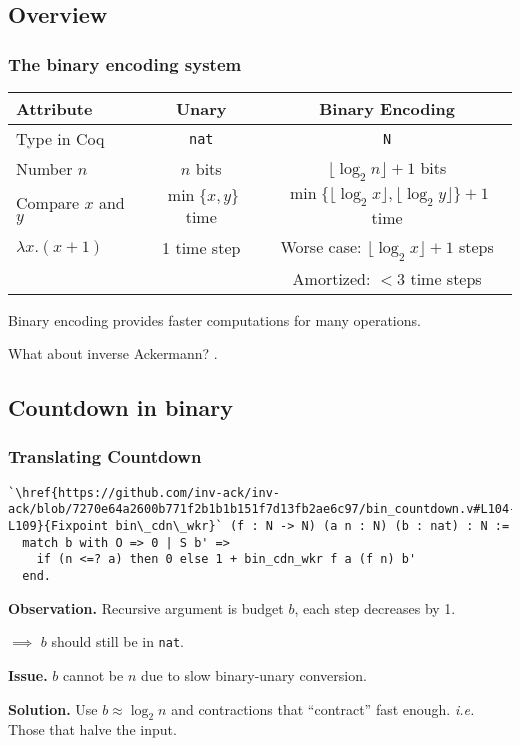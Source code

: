
\subsection{Overview}

\begin{frame}
\frametitle{The binary encoding system}

\begin{tabular}{l|c|c}
	Attribute & Unary & Binary Encoding \\ \hline
	Type in Coq & \texttt{nat} & \texttt{N} \\[7pt]
	Number $n$ & $n$ bits & $\lfloor \log_2n \rfloor + 1$ bits \\[7pt]
	Compare $x$ and $y$ & $\min\{x, y\}$ time & $\min\{\lfloor \log_2x \rfloor, \lfloor \log_2y \rfloor\} + 1$ time \\[9pt]
	$\lambda x. (x + 1)$ & 1 time step & Worse case: $\lfloor \log_2x \rfloor + 1$ steps \\
	                     &             & Amortized: $< 3$ time steps \\
	                    
\end{tabular}

\bigskip

Binary encoding provides faster computations for many operations.

\smallskip

What about inverse Ackermann? .

\end{frame}


\subsection{Countdown in binary}


\begin{frame}[fragile]
\frametitle{Translating Countdown}

\begin{lstlisting}
`\href{https://github.com/inv-ack/inv-ack/blob/7270e64a2600b771f2b1b1b151f7d13fb2ae6c97/bin_countdown.v#L104-L109}{Fixpoint bin\_cdn\_wkr}` (f : N -> N) (a n : N) (b : nat) : N :=
  match b with O => 0 | S b' =>
    if (n <=? a) then 0 else 1 + bin_cdn_wkr f a (f n) b'
  end.
\end{lstlisting}

\bigskip

\textbf{Observation.} Recursive argument is budget $b$, each step decreases by 1.

$\implies$ $b$ should still be in \texttt{nat}.

\bigskip

\textbf{Issue.} $b$ cannot be $n$ due to slow binary-unary conversion.

\bigskip

\textbf{Solution.} Use $b \approx \log_2n$ and contractions that ``contract'' fast enough. \emph{i.e.} Those that halve the input.
\end{frame}



